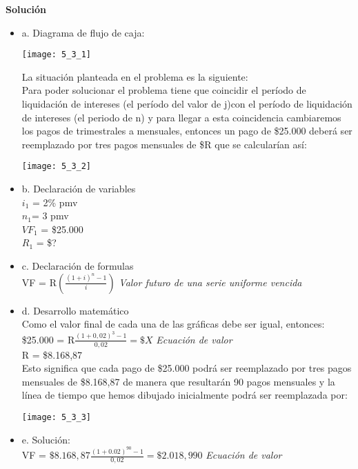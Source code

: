 \textbf{Solución}\\
\begin{itemize}
	\item a. Diagrama de flujo de caja:
	\begin{center}
		\texttt{[image: 5\_3\_1]}
	\end{center}
	La situación planteada en el problema es la siguiente:\\
	
	Para poder  solucionar  el  problema  tiene que coincidir el período de liquidación de intereses (el período del valor de j)con el período de liquidación de intereses (el periodo de n) y para llegar a esta coincidencia cambiaremos los pagos  de  trimestrales  a  mensuales,  entonces  un  pago  de  \$25.000  deberá  ser reemplazado por tres pagos mensuales de \$R que se calcularían así:\\ 
	
	\begin{center}
		\texttt{[image: 5\_3\_2]}
	\end{center}
	
	
	\item b. Declaración de variables\\
    $i_{1}$ = 2\% pmv\\
    $n_{1}$= 3 pmv\\
	$VF_{1}$ = \$25.000\\
	$R_{1}$ = \$?\\
	
	\item c. Declaración de formulas\\
	VF = R$(\frac{(1+i)^n-1}{i})$ \hspace{35 pt} \textit{Valor futuro de una serie uniforme vencida}
	\\
	\item d. Desarrollo matemático\\
	Como el valor final de cada una de las gráficas debe ser igual, entonces:\\
	
	\$25.000 = R$\frac{(1+0,02)^3-1}{0,02} = \$X$ \hspace{35 pt} \textit{Ecuación de valor} \\
	R = \$8.168,87\\

	Esto significa  que  cada  pago  de  \$25.000  podrá  ser  reemplazado  por  tres  pagos mensuales de \$8.168,87 de manera que resultarán 90 pagos mensuales y la línea de tiempo que hemos dibujado inicialmente podrá ser reemplazada por:
	\begin{center}
		\texttt{[image: 5\_3\_3]}
	\end{center}

	\item e. Solución:\\
	VF = $\$8.168,87\frac{(1+0.02)^{90}-1}{0,02} = \$2.018,990$  \hspace{35 pt} \textit{Ecuación de valor}\\
\end{itemize}	

